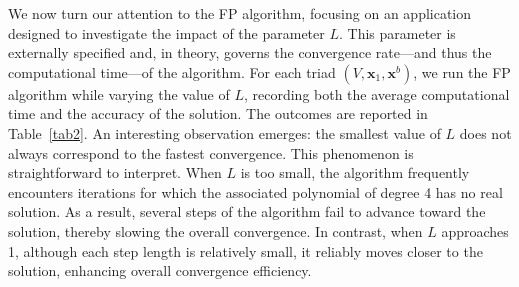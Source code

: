 \documentclass[preprint,11pt,authoryear]{elsarticle}
\begin{document}
We now turn our attention to the FP algorithm, focusing on an application designed to investigate the impact of the parameter $L$. This parameter is externally specified and, in theory, governs the convergence rate—and thus the computational time—of the algorithm. For each triad $(V, \mathbf{x}_1, \mathbf{x}^b)$, we run the FP algorithm while varying the value of $L$, recording both the average computational time and the accuracy of the solution. The outcomes are reported in Table~\ref{tab2}. An interesting observation emerges: the smallest value of $L$ does not always correspond to the fastest convergence. This phenomenon is straightforward to interpret. When $L$ is too small, the algorithm frequently encounters iterations for which the associated polynomial of degree 4 has no real solution. As a result, several steps of the algorithm fail to advance toward the solution, thereby slowing the overall convergence. In contrast, when $L$ approaches 1, although each step length is relatively small, it reliably moves closer to the solution, enhancing overall convergence efficiency.
\end{document}

